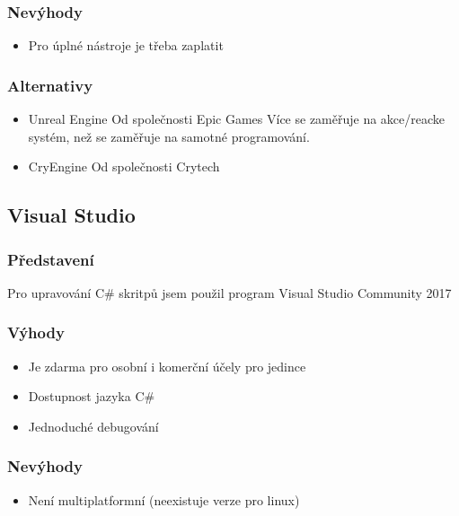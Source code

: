 \documentclass[12pt]{article}
\begin{document}
        \subsubsection{Nevýhody}
            \begin{itemize}
                \item Pro úplné nástroje je třeba zaplatit
            \end{itemize}
        \subsubsection{Alternativy}
            \begin{itemize}
                \item Unreal Engine
                    \subitem Od společnosti Epic Games
                    \subitem Více se zaměřuje na akce/reacke systém, než se zaměřuje na samotné programování.
                \item CryEngine
                    \subitem Od společnosti Crytech
            \end{itemize}
    
    
    \subsection{Visual Studio}
    \subsubsection{Představení}
        Pro upravování C\# skritpů jsem použil program Visual Studio Community 2017 \cite{website:vs}
    \subsubsection{Výhody}
        \begin{itemize}
                \item Je zdarma pro osobní i komerční účely pro jedince
                \item Dostupnost jazyka C\#
                \item Jednoduché debugování
            \end{itemize}
    \subsubsection{Nevýhody}
        \begin{itemize}
                \item Není multiplatformní (neexistuje verze pro linux)
            \end{itemize}
    
\end{document}
